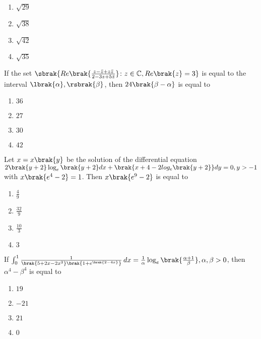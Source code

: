 	\begin{enumerate}
		\item $\sqrt{29}$ 
		\item $\sqrt{38}$ 
		\item $\sqrt{42}$ 
		\item $\sqrt{35}$ 
	\end{enumerate}

    \item If the set $\sbrak{Re\brak{\frac{z - \bar{z} + z\bar{z}}{2 - 3z + 5\bar{z}}} \colon z \in \mathbb{C}, Re\brak{z} = 3}$ is equal to the interval $\lbrak{\alpha}, \rsbrak{\beta}$, then $24\brak{\beta - \alpha}$ is equal to 
    \hfill{}

	\begin{enumerate}
		\item $36$ 
		\item $27$
		\item $30$
		\item $42$
	\end{enumerate}

    \item Let $x = x\brak{y}$ be the solution of the differential equation $2\brak{y + 2}\log_{e}\brak{y + 2} dx + \brak{x + 4 - 2log_{e}\brak{y + 2}} dy = 0, y > -1$ with $x\brak{e^4 - 2} = 1$. Then $x\brak{e^9 - 2}$ is equal to
    \hfill{}

	\begin{enumerate}
		\item $\frac{4}{9}$
		\item $\frac{32}{9}$
		\item $\frac{10}{3}$
		\item $3$
	\end{enumerate}

    \item If $\int_{0}^{1} \frac{1}{\brak{5 + 2x - 2x^2}\brak{1 + e^{\brak{2 - 4x}}}} \, dx = \frac{1}{\alpha}\log_{e}\brak{\frac{\alpha + 1}{\beta}}, \alpha, \beta > 0$, then $\alpha^4 - \beta^4$ is equal to
    \hfill{}

	\begin{enumerate}
		\item $19$ 
		\item $-21$
		\item $21$
		\item $0$
	\end{enumerate}


